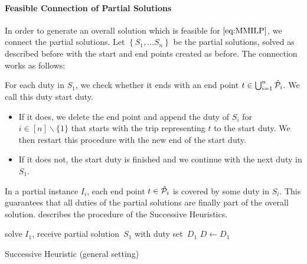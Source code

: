\paragraph{Feasible Connection of Partial Solutions} \parfill

In order to generate an overall solution which is feasible for $\eqref{eq:MMILP}$, we connect the partial solutions. Let ${\left\{S_1,\dots S_n\right\}}$ be the partial solutions, solved as described before with the start and end points created as before. The connection works as follows:

For each duty in $S_1$, we check whether it ends with an end point $t\in\bigcup_{i=1}^n\hat{\mathcal{P}}_i$. We call this duty start duty.
\begin{itemize}
	\item
		If it does, we delete the end point and append the duty of $S_i$ for ${i\in[n]\backslash\{1\}}$ that starts with the trip representing $t$ to the start duty. We then restart this procedure with the new end of the start duty.
	\item
		If it does not, the start duty is finished and we continue with the next duty in $S_1$.
\end{itemize}

In a partial instance $I_i$, each end point ${t\in\hat{\mathcal{P}}_i}$ is covered by some duty in $S_i$. This guarantees that all duties of the partial solutions are finally part of the overall solution.  describes the procedure of the Successive Heuristics.

\begin{algorithm}[htb]
	\SetAlgoLined
	solve $I_1$, receive partial solution~$S_1$ with duty set~$D_1$\;
	$D\gets D_1$\;
	\caption{Successive Heuristic (general setting) \label{alg:successive_heuristic}}
\end{algorithm}

